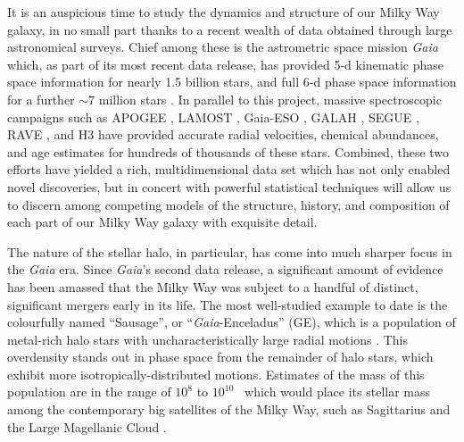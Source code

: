 It is an auspicious time to study the dynamics and structure of our Milky Way galaxy, in no small part thanks to a recent wealth of data obtained through large astronomical surveys. Chief among these is the astrometric space mission \textit{Gaia} \parencite{gaia} which, as part of its most recent data release, has provided 5-d kinematic phase space information for nearly 1.5 billion stars, and full 6-d phase space information for a further $\sim7$ million stars \parencite{gaiaedr3}. In parallel to this project, massive spectroscopic campaigns such as APOGEE \parencite{apogee}, LAMOST \parencite{lamost}, Gaia-ESO \parencite{gaiaeso}, GALAH \parencite{galah}, SEGUE \parencite{segue}, RAVE \parencite[][for the most recent data release]{ravedr16}, and H3 \parencite{h3} have provided accurate radial velocities, chemical abundances, and age estimates for hundreds of thousands of these stars. Combined, these two efforts have yielded a rich, multidimensional data set which has not only enabled novel discoveries, but in concert with powerful statistical techniques will allow us to discern among competing models of the structure, history, and composition of each part of our Milky Way galaxy with exquisite detail. 

The nature of the stellar halo, in particular, has come into much sharper focus in the \textit{Gaia} era. Since \textit{Gaia}'s second data release,  a significant amount of evidence has been amassed that the Milky Way was subject to a handful of distinct, significant mergers early in its life. The most well-studied example to date is the colourfully named ``Sausage'', or ``\textit{Gaia}-Enceladus'' (GE), which is a population of metal-rich halo stars with uncharacteristically large radial motions \parencite{helmi18,belokurov18,haywood18}. This overdensity stands out in phase space from the remainder of halo stars, which exhibit more isotropically-distributed motions. Estimates of the mass of this population are in the range of $10^{8}$ to $10^{10}$~\Msun \parencite{belokurov18,helmi18,fattahi19,deason19,mackereth19a,mackereth20,kruijssen20,naidu21} which would place its stellar mass among the contemporary big satellites of the Milky Way, such as Sagittarius and the Large Magellanic Cloud \parencite[e.g.][]{niederste-ostholt10,vandermarel06}.

